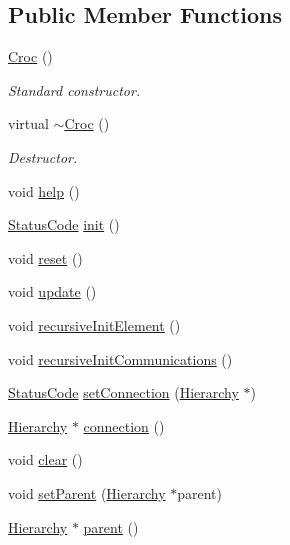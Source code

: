 \subsection*{Public Member Functions}
\begin{DoxyCompactItemize}
\item 
\hyperlink{classCroc_ac9997a70a0b5b197789f6e2ba80b498b}{Croc} ()
\begin{DoxyCompactList}\small\item\em Standard constructor. \item\end{DoxyCompactList}\item 
virtual \hyperlink{classCroc_ace1e761410c9b53c1ff062a0dadcbd7b}{$\sim$Croc} ()
\begin{DoxyCompactList}\small\item\em Destructor. \item\end{DoxyCompactList}\item 
void \hyperlink{classCroc_a21195cea3b5ba13f90397cc8faa52633}{help} ()
\item 
\hyperlink{classStatusCode}{StatusCode} \hyperlink{classCroc_a0ccc2406507c081f637a4d0346494f09}{init} ()
\item 
void \hyperlink{classCroc_aa95453776f49e4affe375500e96eb906}{reset} ()
\item 
void \hyperlink{classCroc_a74b7f08ffdc15f8244af02c8cdccbc8f}{update} ()
\item 
void \hyperlink{classElement_a3c0abcb36f8906688bb7e32608df7086}{recursiveInitElement} ()
\item 
void \hyperlink{classElement_a82119ed37dff76508a2746a853ec35ba}{recursiveInitCommunications} ()
\item 
\hyperlink{classStatusCode}{StatusCode} \hyperlink{classElement_ab476b4b1df5954141ceb14f072433b89}{setConnection} (\hyperlink{classHierarchy}{Hierarchy} $\ast$)
\item 
\hyperlink{classHierarchy}{Hierarchy} $\ast$ \hyperlink{classElement_af57444353c1ddf9fa0109801e97debf7}{connection} ()
\item 
void \hyperlink{classHierarchy_af4d43b0765b402670eed2d62c73405af}{clear} ()
\item 
void \hyperlink{classHierarchy_a585ad1aeec16077a0e532ab8b4fc557b}{setParent} (\hyperlink{classHierarchy}{Hierarchy} $\ast$parent)
\item 
\hyperlink{classHierarchy}{Hierarchy} $\ast$ \hyperlink{classHierarchy_a1c7bec8257e717f9c1465e06ebf845fc}{parent} ()

\end{DoxyCompactItemize}
